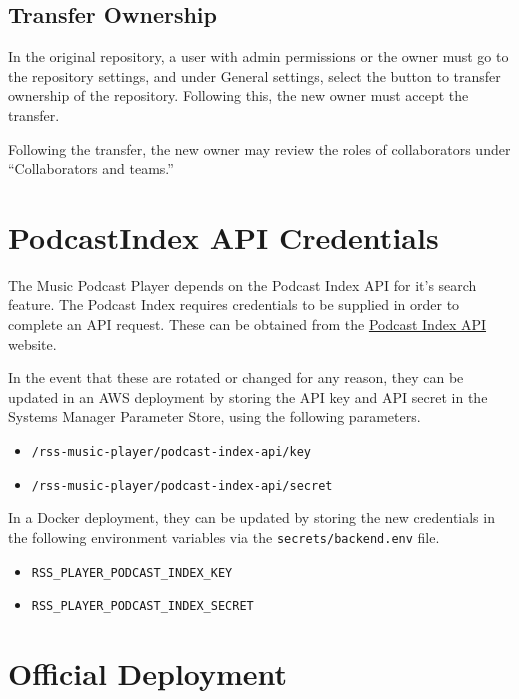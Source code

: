 \documentclass{article}
\begin{document}
\subsection{Transfer Ownership}

In the original repository, a user with admin permissions
or the owner must go to the repository settings, and under
General settings, select the button to transfer ownership
of the repository. Following this, the new owner must
accept the transfer.

Following the transfer, the new owner may review the roles
of collaborators under ``Collaborators and teams.''

\section{PodcastIndex API Credentials}

The Music Podcast Player depends on the Podcast Index API
for it's search feature. The Podcast Index requires
credentials to be supplied in order to complete an API 
request. These can be obtained from the
\href{https://api.podcastindex.org/}{Podcast Index API}
website.

In the event that these are rotated or changed for any
reason, they can be updated in an AWS deployment by 
storing the API key and API secret in the Systems Manager
Parameter Store, using the following parameters.

\begin{itemize}
    \item \verb|/rss-music-player/podcast-index-api/key|
    \item \verb|/rss-music-player/podcast-index-api/secret|
\end{itemize}

In a Docker deployment, they can be updated by storing the
new credentials in the following environment variables
via the \verb|secrets/backend.env| file.

\begin{itemize}
    \item \verb|RSS_PLAYER_PODCAST_INDEX_KEY|
    \item \verb|RSS_PLAYER_PODCAST_INDEX_SECRET|
\end{itemize}

\section{Official Deployment}
\end{document}
